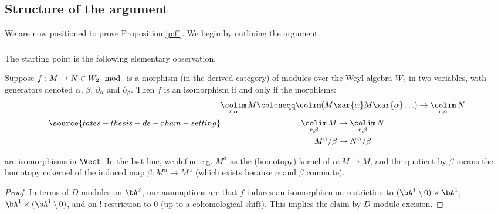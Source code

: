 \subsection{Structure of the argument}

We are now positioned to prove Proposition \ref{p:ff}.
We begin by outlining the argument.

\subsubsection{}

The starting point is the following elementary observation.

\begin{lem}
\notready\label{l:weyl-bimod}

Suppose $f:M \to N \in W_2\mod$ is a morphism (in the derived category) of
modules over the Weyl algebra $W_2$ in two variables,
with generators denoted $\alpha$, $\beta$, $\partial_{\alpha}$ and $\partial_{\beta}$.
Then $f$ is an isomorphism if and only if the morphisms:
%
\begin{equation}\label{eq:weyl-bimod}
\source{tates-thesis-de-rham-setting}
\begin{gathered}
\underset{r,\alpha}{\colim} \, M \coloneqq \colim(M \xar{\alpha} M \xar{\alpha} \ldots) \to
\underset{r,\alpha}{\colim} \, N \\
\underset{r,\beta}{\colim} \, M \to \underset{r,\beta}{\colim} \, N \\
M^{\alpha}/\beta \to N^{\alpha}/\beta
\end{gathered}
\end{equation}

 are isomorphisms in $\Vect$.
In the last line, we define e.g. $M^{\alpha}$ as the
(homotopy) kernel of $\alpha:M \to M$, and the quotient by $\beta$ means
the homotopy cokernel of the induced map $\beta:M^{\alpha} \to M^{\alpha}$
(which exists because $\alpha$ and $\beta$ commute).

\end{lem}

\begin{proof}

In terms of $D$-modules on $\bA^2$, our assumptions are that $f$ induces an isomorphism
on restriction to $(\bA^1\setminus 0) \times \bA^1$, $\bA^1 \times (\bA^1 \setminus 0)$,
and on $!$-restriction to $0$ (up to a cohomological shift). This implies the claim by
$D$-module excision.

\end{proof}

